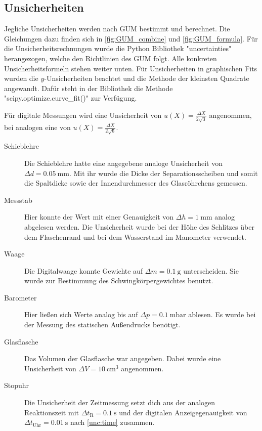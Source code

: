 \subsection{Unsicherheiten}\label{VGuD}

Jegliche Unsicherheiten werden nach GUM bestimmt und berechnet.
Die Gleichungen dazu finden sich in \ref{fig:GUM_combine} und \ref{fig:GUM_formula}.
Für die Unsicherheitsrechnungen wurde die Python Bibliothek "uncertainties" herangezogen, welche den Richtlinien des GUM folgt.
Alle konkreten Unsicherheitsformeln stehen weiter unten.
Für Unsicherheiten in graphischen Fits wurden die $y$-Unsicherheiten beachtet und die Methode der kleinsten Quadrate angewandt.
Dafür steht in der Bibliothek die Methode "scipy.optimize.curve\_fit()" zur Verfügung.


Für digitale Messungen wird eine Unsicherheit von $u(X) = \frac{\Delta X}{2\sqrt{3}}$ angenommen, bei analogen eine von $u(X) = \frac{\Delta X}{2\sqrt{6}}$.

\begin{description}
	\item[Schieblehre] Die Schieblehre hatte eine angegebene analoge Unsicherheit von $\Delta d = \SI{0.05}{\milli\meter}$.
	Mit ihr wurde die Dicke der Separationsscheiben und somit die Spaltdicke sowie der Innendurchmesser des Glasröhrchens gemessen.
		
	\item[Messstab] Hier konnte der Wert mit einer Genauigkeit von $\Delta h = \SI{1}{\milli\meter}$ analog abgelesen werden.
	Die Unsicherheit wurde bei der Höhe des Schlitzes über dem Flaschenrand und bei dem Wasserstand im Manometer verwendet.
	
	\item[Waage] Die Digitalwaage konnte Gewichte auf $\Delta m = \SI{0.1}{\gram}$ unterscheiden.
	Sie wurde zur Bestimmung des Schwingkörpergewichtes benutzt.
	
	\item[Barometer] Hier ließen sich Werte analog bis auf $\Delta p = \SI{0.1}{\milli\bar}$ ablesen.
	Es wurde bei der Messung des statischen Außendrucks benötigt.
	
	\item[Glasflasche] Das Volumen der Glasflasche war angegeben.
	Dabei wurde eine Unsicherheit von $\Delta V = \SI{10}{\centi\meter^3}$ angenommen.
	
	\item[Stopuhr] Die Unsicherheit der Zeitmessung setzt dich aus der analogen Reaktionszeit mit $\Delta t_\text{R} = \SI{0.1}{\second}$ und der digitalen Anzeigegenauigkeit von $\Delta t_\text{Uhr} = \SI{0.01}{\second}$ nach \ref{unc:time} zusammen.
		
\end{description}

